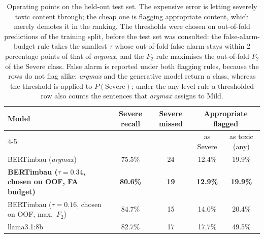 \begin{table}[!t]
\centering
\caption{Operating points on the held-out test set. The expensive error is letting severely toxic content through; the cheap one is flagging appropriate content, which merely demotes it in the ranking. The thresholds were chosen on out-of-fold predictions of the training split, before the test set was consulted: the false-alarm-budget rule takes the smallest $\tau$ whose out-of-fold false alarm stays within 2 percentage points of that of \emph{argmax}, and the $F_2$ rule maximises the out-of-fold $F_2$ of the Severe class. False alarm is reported under both flagging rules, because the rows do not flag alike: \emph{argmax} and the generative model return a class, whereas the threshold is applied to $P(\text{Severe})$; under the any-level rule a thresholded row also counts the sentences that \emph{argmax} assigns to Mild.}
\label{tab:pontos-operacao}
\begin{tabular}{lcccc}
\toprule
Model & Severe recall & Severe missed & \multicolumn{2}{c}{Appropriate flagged} \\
\cmidrule(lr){4-5}
 & & & as Severe & as toxic (any)  \\
\midrule
BERTimbau (\emph{argmax}) & 75.5\% & 24 & 12.4\% & 19.9\% \\
\textbf{BERTimbau ($\tau = 0.34$, chosen on OOF, FA budget)} & \textbf{80.6\%} & \textbf{19} & \textbf{12.9\%} & \textbf{19.9\%} \\
BERTimbau ($\tau = 0.16$, chosen on OOF, max.\ $F_2$) & 84.7\% & 15 & 14.0\% & 20.4\% \\
llama3.1:8b & 82.7\% & 17 & 17.7\% & 49.5\% \\
\bottomrule
\end{tabular}
\end{table}
